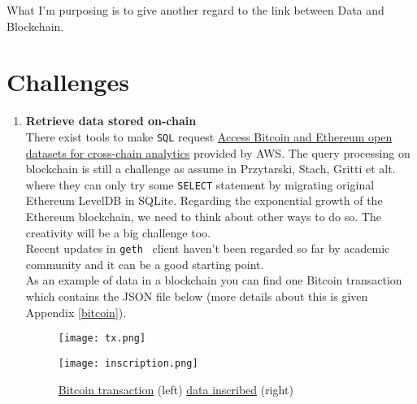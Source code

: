 \documentclass[12pt]{article}
\begin{document}
What I'm purposing is to give another regard to the link between Data and Blockchain.\\


\section{Challenges}

\begin{enumerate}

\item {\bf Retrieve data stored on-chain}\\ 
There exist tools to make \texttt{SQL} request \href{https://aws.amazon.com/blogs/database/access-bitcoin-and-ethereum-open-datasets-for-cross-chain-analytics/}{Access Bitcoin and Ethereum open datasets for cross-chain analytics} provided by AWS.
The query processing on blockchain is still a challenge as assume in Przytarski, Stach, Gritti et alt. \cite{query} where they can only try some \texttt{SELECT} statement by migrating original Ethereum LevelDB in SQLite. Regarding the exponential  growth of the Ethereum blockchain, we need to think about other ways to do so. The creativity will be a big challenge too.\\
Recent updates in \texttt{geth} \cite{geth} client haven't been regarded so far by academic community and it can be a good starting point.\\
As an example of data in a blockchain you can find one Bitcoin transaction which contains the JSON file below (more details about this is given Appendix \ref{bitcoin}). 
\begin{figure}[h!]
  \centering
  \begin{minipage}[b]{0.5\textwidth}
    \centering
    \texttt{[image: tx.png]}
  \end{minipage}
  \hfill
  \begin{minipage}[b]{0.4\textwidth}
    \centering
    \texttt{[image: inscription.png]}
  \end{minipage}
  \caption{\href{https://mempool.space/tx/940e8a6ec3943962c55fdd84809f3d878c6990da123cd3d02ae4769d3d86f3a6}{Bitcoin transaction} (left) \href{https://ordinals.com/inscription/940e8a6ec3943962c55fdd84809f3d878c6990da123cd3d02ae4769d3d86f3a6i0}{data inscribed} (right)}
\end{figure}


\end{enumerate}
\end{document}
